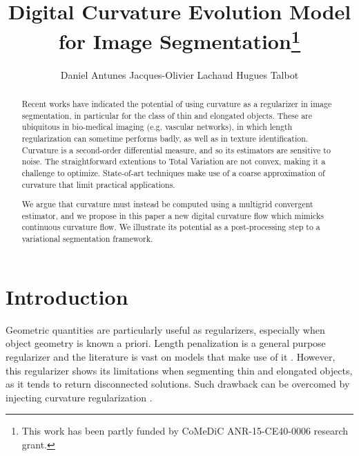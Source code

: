 \documentclass[runningheads]{llncs}
\begin{document}
%
\title{Digital Curvature Evolution Model for Image Segmentation\thanks{This  work has  been  partly  funded by CoMeDiC ANR-15-CE40-0006 research grant.}}

\author{Daniel Antunes
Jacques-Olivier Lachaud
Hugues Talbot}
%
%
%
\maketitle              %
%
\begin{abstract}
  Recent works have indicated the potential of using curvature as a
  regularizer in image segmentation, in particular for the class of
  thin and elongated objects. These are ubiquitous in bio-medical
  imaging (e.g. vascular networks), in which length regularization can
  sometime performs badly, as well as in texture
  identification. Curvature is a second-order differential measure,
  and so its estimators are sensitive to noise. The straightforward
  extentions to Total Variation are not convex, making it a challenge
  to optimize.  State-of-art techniques make use of a coarse
  approximation of curvature that limit practical applications.

  We argue that curvature must instead be computed using a multigrid
  convergent estimator, and we propose in this paper a new digital
  curvature flow which mimicks continuous curvature flow. We
  illustrate its potential as a post-processing step to a variational
  segmentation framework.
 
\end{abstract}
%
%
%
\setcounter{footnote}{0}
\section{Introduction}

Geometric quantities are particularly useful as regularizers, especially when object geometry is known a priori. Length penalization is a general purpose regularizer and the literature is vast on models that make use of it \cite{casseles97,appleton05}. However, this regularizer shows its limitations when segmenting  thin and elongated objects, as it tends to return disconnected solutions. Such drawback can be overcomed by injecting curvature regularization \cite{zehiry10}.
				
\end{document}
